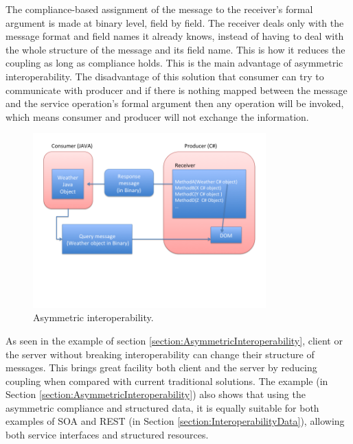 The compliance-based assignment of the message to the receiver’s formal argument is made at binary level, field by field. The receiver deals only with the message format and field names it already knows, instead of having to deal with the whole structure of the message and its field name. This is how it reduces the coupling as long as compliance holds. This is the main advantage of asymmetric interoperability. The disadvantage of this solution that consumer can try to communicate with producer and if there is nothing mapped between the message and the service operation’s formal argument then any operation will be invoked, which means consumer and producer will not exchange the information.

 \begin{figure}[!htb]
   \centering
   \includegraphics[width=0.8\textwidth]{Figures/compliance.png}
   \caption[Asymmetric interoperability.]{Asymmetric interoperability.}
   \label{fig:Asymmetricdatainteroperability}
 \end{figure}

As seen in the example of section \ref{section:AsymmetricInteroperability}, client or the server without breaking interoperability can change their structure of messages. This brings great facility both client and the server by reducing coupling when compared with current traditional solutions. The example (in Section \ref{section:AsymmetricInteroperability}) also shows that using the asymmetric compliance and structured data, it is equally suitable for both examples of SOA and REST (in Section \ref{section:InteroperabilityData}), allowing both service interfaces and structured resources.

